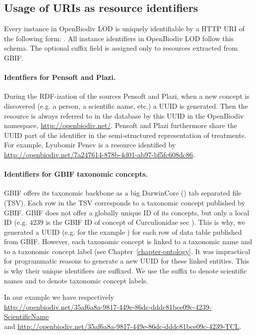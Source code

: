 \subsection{Usage of URIs as resource identifiers}

Every instance in OpenBiodiv LOD is uniquely identifiable by a HTTP URI of the following form: . All instance identifiers in OpenBiodiv LOD follow this schema. The optional suffix field is assigned only to resources extracted from GBIF.

\paragraph{Identfiers for Pensoft and Plazi.} During the RDF-ization of the sources Pensoft and Plazi, when a new concept is discovered (e.g. a person, a scientific name, etc.) a UUID is generated. Then the resource is always referred to in the database by this UUID in the OpenBiodiv namespace, \url{http://openbiodiv.net/}. Pensoft and Plazi furthermore share the UUID part of the identifier in the semi-structured representation of treatments. For example, Lyubomir Penev is a resource identified by \url{http://openbiodiv.net/7a247614-878b-4d01-ab97-bf5fc608dc86}.

\paragraph{Identifiers for GBIF taxonomic concepts.} GBIF offers its taxonomic backbone as a big DarwinCore (\cite{wieczorek_darwin_2012}) tab separated file (TSV). Each row in the TSV corresponds to a taxonomic concept published by GBIF. GBIF does not offer a globally unique ID of its concepts, but only a local ID (e.g. $4239$ is the GBIF ID of concept of Curculionidae sec \cite{gbif_secretariat_gbif_2017}). This is why, we generated a UUID (e.g. for the example ) for each row of data table published from GBIF. However, each taxonomic concept is linked to a taxonomic name and to a taxonomic concept label (see Chapter~\ref{chapter-ontology}. It was impractical for programmatic reasons to generate a new UUID for these linked entities. This is why their unique identifiers are suffixed. We use the suffix  to denote scientific names and  to denote taxonomic concept labels.

In our example we have respectively\\\url{http://openbiodiv.net/35af6a8a-9817-449e-86dc-dddc81bce09c-4239-ScientificName}\\and \url{http://openbiodiv.net/35af6a8a-9817-449e-86dc-dddc81bce09c-4239-TCL}.


